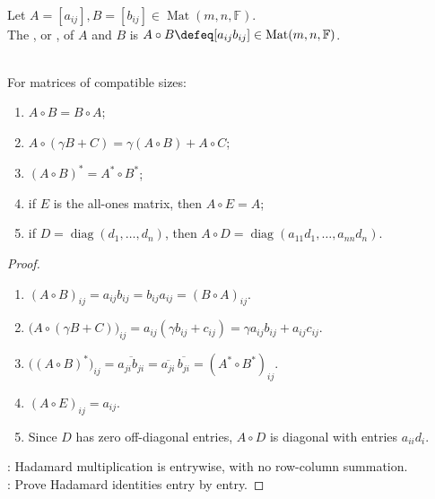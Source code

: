 \begin{definition} \label{def:hadamard-product} \\
Let $A=[a_{ij}],B=[b_{ij}]\in\operatorname{Mat}(m,n,\mathbb{F})$.\\
The , or , of $A$ and $B$ is $A\circ B\defeq [a_{ij}b_{ij}]\in\operatorname{Mat}(m,n,\mathbb{F})$.
\end{definition}

\begin{proposition} \label{prop:basic-hadamard-identities} \\
For matrices of compatible sizes:
\begin{enumerate}[label=(\roman*)]
\setlength{\itemsep}{0pt}
\item $A\circ B=B\circ A$;
\item $A\circ(\gamma B+C)=\gamma(A\circ B)+A\circ C$;
\item $(A\circ B)^*=A^*\circ B^*$;
\item if $E$ is the all-ones matrix, then $A\circ E=A$;
\item if $D=\operatorname{diag}(d_1,\ldots,d_n)$, then $A\circ D=\operatorname{diag}(a_{11}d_1,\ldots,a_{nn}d_n)$.
\end{enumerate}
\begin{proof}
\begin{enumerate}[label=(\roman*)]
\setlength{\itemsep}{0pt}
\item $(A\circ B)_{ij}=a_{ij}b_{ij}=b_{ij}a_{ij}=(B\circ A)_{ij}$.
\item $\bigl(A\circ(\gamma B+C)\bigr)_{ij}=a_{ij}(\gamma b_{ij}+c_{ij})=\gamma a_{ij}b_{ij}+a_{ij}c_{ij}$.
\item $\bigl((A\circ B)^*\bigr)_{ij}=\overline{a_{ji}b_{ji}}=\overline{a_{ji}}\,\overline{b_{ji}}=(A^*\circ B^*)_{ij}$.
\item $(A\circ E)_{ij}=a_{ij}$.
\item Since $D$ has zero off-diagonal entries, $A\circ D$ is diagonal with entries $a_{ii}d_i$.
\end{enumerate}
: Hadamard multiplication is entrywise, with no row-column summation.\\
: Prove Hadamard identities entry by entry.
\end{proof}
\end{proposition}

